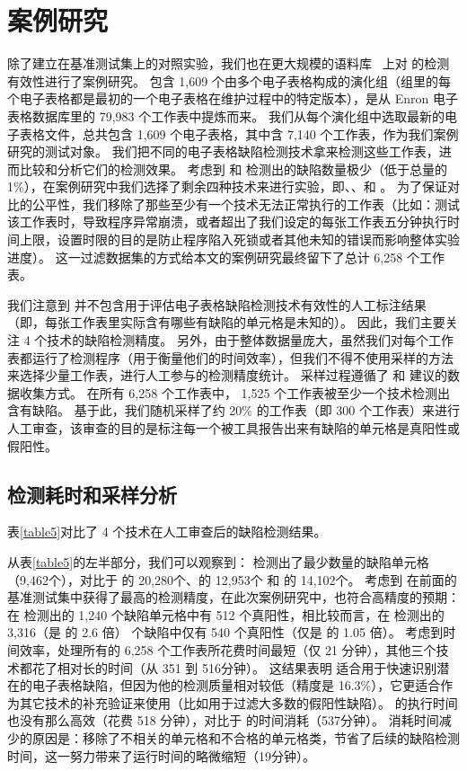 \section{案例研究}
除了建立在基准测试集上的对照实验，我们也在更大规模的语料库 \ven~\cite{xu2017spreadcluster}上对 \wa 的检测有效性进行了案例研究。
\ven 包含 1,609 个由多个电子表格构成的演化组（组里的每个电子表格都是最初的一个电子表格在维护过程中的特定版本），是从 Enron 电子表格数据库\cite{hermans2015enron}里的 79,983 个工作表中提炼而来。
我们从每个演化组中选取最新的电子表格文件，总共包含 1,609 个电子表格，其中含 7,140 个工作表，作为我们案例研究的测试对象。
我们把不同的电子表格缺陷检测技术拿来检测这些工作表，进而比较和分析它们的检测效果。
考虑到 \uc 和 \di 检测出的缺陷数量极少（低于总量的 1\%），在案例研究中我们选择了剩余四种技术来进行实验，即\am 、\ca、\cu 和 \wa。
为了保证对比的公平性，我们移除了那些至少有一个技术无法正常执行的工作表（比如：测试该工作表时，导致程序异常崩溃，或者超出了我们设定的每张工作表五分钟执行时间上限，设置时限的目的是防止程序陷入死锁或者其他未知的错误而影响整体实验进度）。
这一过滤数据集的方式给本文的案例研究最终留下了总计 6,258 个工作表。

我们注意到 \ven 并不包含用于评估电子表格缺陷检测技术有效性的人工标注结果（即，每张工作表里实际含有哪些有缺陷的单元格是未知的）。
因此，我们主要关注 4 个技术的缺陷检测精度。
另外，由于整体数据量庞大，虽然我们对每个工作表都运行了检测程序（用于衡量他们的时间效率），但我们不得不使用采样的方法来选择少量工作表，进行人工参与的检测精度统计。
采样过程遵循了 \am 和 \cu 建议的数据收集方式。
在所有 6,258 个工作表中， 1,525 个工作表被至少一个技术检测出含有缺陷。
基于此，我们随机采样了约 20\% 的工作表（即 300 个工作表）来进行人工审查，该审查的目的是标注每一个被工具报告出来有缺陷的单元格是真阳性或假阳性。

\subsection{检测耗时和采样分析}
表\ref{table5}对比了 4 个技术在人工审查后的缺陷检测结果。

从表\ref{table5}的左半部分，我们可以观察到：
\wa 检测出了最少数量的缺陷单元格（9,462个），对比于 \am 的 20,280个、\ca 的 12,953个 和 \cu 的 14,102个。
考虑到 \wa 在前面的基准测试集中获得了最高的检测精度，在此次案例研究中，\wa 也符合高精度的预期：在 \wa 检测出的 1,240 个缺陷单元格中有 512 个真阳性，相比较而言，在 \am 检测出的 3,316（是 \wa 的 2.6 倍） 个缺陷中仅有 540 个真阳性（仅是 \wa 的 1.05 倍）。
考虑到时间效率，\am 处理所有的 6,258 个工作表所花费时间最短（仅 21 分钟），其他三个技术都花了相对长的时间（从 351 到 516分钟）。
这结果表明 \am 适合用于快速识别潜在的电子表格缺陷，但因为他的检测质量相对较低（精度是 16.3\%），它更适合作为其它技术的补充验证来使用（比如用于过滤大多数的假阳性缺陷）。
\wa 的执行时间也没有那么高效（花费 518 分钟），对比于 \cu 的时间消耗（537分钟）。
消耗时间减少的原因是：\wa 移除了不相关的单元格和不合格的单元格类，节省了后续的缺陷检测时间，这一努力带来了运行时间的略微缩短（19分钟）。

